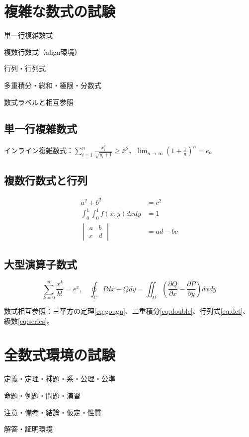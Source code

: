 \documentclass[jp]{../../elegantbook}
\begin{document}
\chapter{複雑な数式の試験}
\begin{introduction}
\item 単一行複雑数式
\item 複数行数式（align環境）
\item 行列・行列式
\item 多重積分・総和・極限・分数式
\item 数式ラベルと相互参照
\end{introduction}

\section{単一行複雑数式}
インライン複雑数式：$\sum_{i=1}^n \frac{x_i^2}{\sqrt{y_i+1}} \geq \bar{x}^2$、$\lim_{n\to\infty} \left(1+\frac{1}{n}\right)^n = e$。

\section{複数行数式と行列}
\begin{align}
a^2 + b^2 &= c^2 \label{eq:gougu} \\
\int_{0}^{1}\int_{0}^{1} f(x,y) dxdy &= 1 \label{eq:double} \\
\begin{vmatrix}
a & b \\
c & d
\end{vmatrix} &= ad-bc \label{eq:det}
\end{align}

\section{大型演算子数式}
\begin{equation}\label{eq:series}
\sum_{k=0}^{\infty} \frac{x^k}{k!} = e^x,\quad \oint_{C} Pdx+Qdy = \iint_{D}\left(\frac{\partial Q}{\partial x}-\frac{\partial P}{\partial y}\right)dxdy
\end{equation}

数式相互参照：三平方の定理\eqref{eq:gougu}、二重積分\eqref{eq:double}、行列式\eqref{eq:det}、級数\eqref{eq:series}。

\chapter{全数式環境の試験}
\begin{introduction}
\item 定義・定理・補題・系・公理・公準
\item 命題・例題・問題・演習
\item 注意・備考・結論・仮定・性質
\item 解答・証明環境
\end{introduction}
\end{document}
